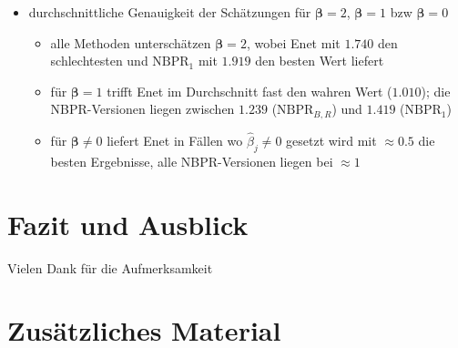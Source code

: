 \documentclass{beamer}
\begin{document}
\begin{frame}
	\begin{itemize}
	\item durchschnittliche Genauigkeit der Schätzungen für $\boldsymbol{\beta} = 2$, $\boldsymbol{\beta} = 1$ bzw $\boldsymbol{\beta} = 0$
	\begin{itemize}
	\item alle Methoden unterschätzen $\boldsymbol{\beta}=2$, wobei Enet mit $1.740$ den schlechtesten und $\text{NBPR}_1$ mit $1.919$ den besten Wert liefert
	\item für $\boldsymbol{\beta} = 1$ trifft Enet im Durchschnitt fast den wahren Wert ($1.010$); die NBPR-Versionen liegen zwischen $1.239$ ($\text{NBPR}_{B,R}$) und $1.419$ ($\text{NBPR}_1$)  
	\item für $\boldsymbol{\beta}\neq 0$ liefert Enet in Fällen wo $\hat{\beta}_j \neq 0$ gesetzt wird mit $\approx0.5$ die besten Ergebnisse, alle NBPR-Versionen liegen bei $\approx 1$
	\end{itemize}
	\end{itemize}
\end{frame}


\section{Fazit und Ausblick}
\begin{frame}

\end{frame}


\begin{frame}
Vielen Dank für die Aufmerksamkeit
\end{frame}


\section{Zusätzliches Material}
\end{document}
